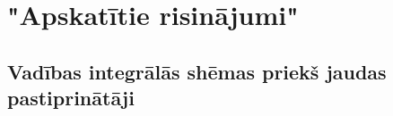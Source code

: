 
\section{"Apskatītie risinājumi"}
\subsection{Vadības integrālās shēmas priekš jaudas pastiprinātāji}

